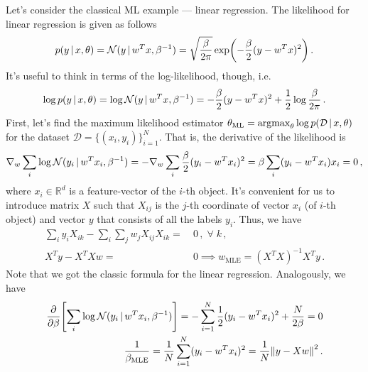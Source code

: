 Let's consider the classical ML example --- linear regression.
The likelihood for linear regression is given as follows
\begin{align}
    p(y\cond x, \theta) = \Normal(y\cond w^Tx, \beta^{-1}) = \sqrt{\frac{\beta}{2\pi}}\exp\left(-\frac{\beta}{2}(y-w^Tx)^2\right)\,.
\end{align}
It's useful to think in terms of the log-likelihood, though, i.e.
\begin{align}
    \log p(y\,|\, x, \theta) = \log\mathcal{N}(y\,|\, w^Tx, \beta^{-1}) = -\frac{\beta}{2}(y- w^Tx)^2 + \frac{1}{2}\log \frac{\beta}{2\pi}\,.
\end{align}
First, let's find the maximum likelihood estimator $\theta_{\text{ML}} = \operatorname*{argmax}_\theta \log p(\mathcal{D}\,|\, x, \theta)$ for the dataset $\mathcal{D} = \{(x_i,y_i)\}_{i=1}^N$.
That is, the derivative of the likelihood is
\begin{align}
    \nabla_w\sum_i\log\mathcal{N}(y_i\,|\, w^Tx_i, \beta^{-1}) = -\nabla_w\sum_i\frac{\beta}{2}(y_i- w^Tx_i)^2 = \beta\sum_i(y_i- w^Tx_i)x_i = 0\,,
\end{align}
where $x_i \in \mathbb{R}^d$ is a feature-vector of the $i$-th object.
It's convenient for us to introduce matrix $X$ such that $X_{ij}$ is the $j$-th coordinate of vector $x_i$ (of $i$-th object) and vector $y$ that consists of all the labels $y_i$.
Thus, we have
\begin{align}
    \sum_i y_iX_{ik} - \sum_i\sum_j w_{j} X_{ij} X_{ik} =~& 0\,, \;\forall\; k\,,\\
    X^Ty - X^TX w  =~& 0 \implies w_{\text{MLE}} = (X^TX)^{-1}X^Ty\,.
    \label{eq:linreg_mle}
\end{align}
Note that we got the classic formula for the linear regression.
Analogously, we have
\begin{align}
   \deriv{}{\beta}\left[\sum_i\log\Normal(y_i\cond w^Tx_i, \beta^{-1})\right] = -\sum_{i=1}^N\frac{1}{2}(y_i- w^Tx_i)^2 + \frac{N}{2\beta} = 0\\
   \frac{1}{\beta_{\text{MLE}}} = \frac{1}{N}\sum_{i=1}^N(y_i- w^Tx_i)^2 = \frac{1}{N}\norm{y-Xw}^2\,.
\end{align}


